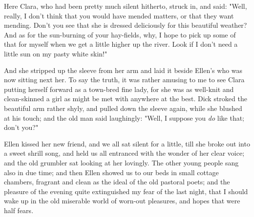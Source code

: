 Here Clara, who had been pretty much silent hitherto, struck in, and
said: "Well, really, I don't think that you would have mended matters,
or that they want mending. Don't you see that she is dressed deliciously
for this beautiful weather? And as for the sun-burning of your
hay-fields, why, I hope to pick up some of that for myself when we get a
little higher up the river. Look if I don't need a little sun on my
pasty white skin!"

And she stripped up the sleeve from her arm and laid it beside Ellen's
who was now sitting next her. To say the truth, it was rather amusing to
me to see Clara putting herself forward as a town-bred fine lady, for
she was as well-knit and clean-skinned a girl as might be met with
anywhere at the best. Dick stroked the beautiful arm rather shyly, and
pulled down the sleeve again, while she blushed at his touch; and the
old man said laughingly: "Well, I suppose you \emph{do} like that; don't
you?"

Ellen kissed her new friend, and we all sat silent for a little, till
she broke out into a sweet shrill song, and held us all entranced with
the wonder of her clear voice; and the old grumbler sat looking at her
lovingly. The other young people sang also in due time; and then Ellen
showed us to our beds in small cottage chambers, fragrant and clean as
the ideal of the old pastoral poets; and the pleasure of the evening
quite extinguished my fear of the last night, that I should wake up in
the old miserable world of worn-out pleasures, and hopes that were half
fears.
